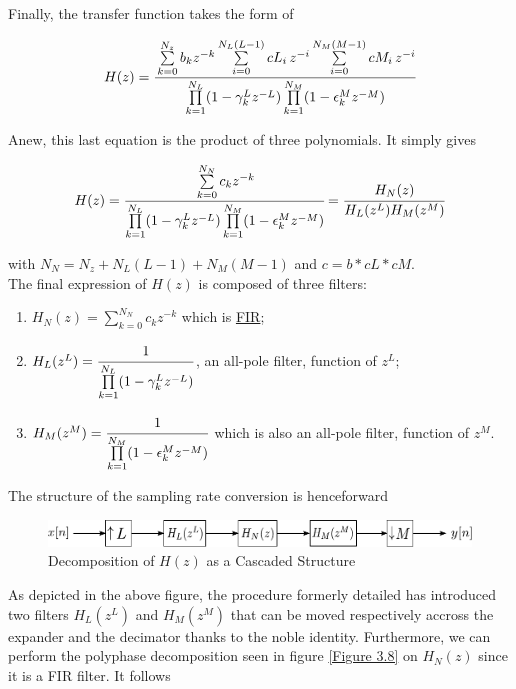 Finally, the transfer function takes the form of 

\begin{align}
	H(z) = \cfrac{\sum\limits_{k=0}^{N_z} b_kz^{-k}\sum\limits_{i=0}^{N_L(L-1)}cL_i\,z^{-i}\sum\limits_{i=0}^{N_M(M-1)}cM_i\,z^{-i}}{\prod\limits_{k=1}^{N_L} (1 - \gamma_k^L z^{-L}) \prod\limits_{k=1}^{N_M} (1 - \epsilon_k^M z^{-M})}
\end{align}

Anew, this last equation is the product of three polynomials. It simply gives 

\begin{align}
H(z) = \cfrac{\sum\limits_{k=0}^{N_N} c_kz^{-k}}{\prod\limits_{k=1}^{N_L} (1 - \gamma_k^L z^{-L}) \prod\limits_{k=1}^{N_M} (1 - \epsilon_k^M z^{-M})} = \cfrac{H_N(z)}{H_L(z^L)H_M(z^M)}\label{eqn:3.22}
\end{align}

with $N_N = N_z + N_L(L-1) + N_M(M-1)$ and $c = b*cL*cM$. \\


The final expression of $H(z)$ is composed of three filters: 

\begin{enumerate}
	\item $H_N(z) = \sum\limits_{k=0}^{N_N} c_kz^{-k}$ which is \hyperlink{FIR}{FIR};
	\item $H_L(z^L)  = \cfrac{1}{\prod\limits_{k=1}^{N_L} (1 - \gamma_k^L z^{-L})}$, an all-pole filter, function of $z^L$;
	\item $H_M(z^M) = \cfrac{1}{\prod\limits_{k=1}^{N_M} (1 - \epsilon_k^M z^{-M})}$ which is also an all-pole filter, function of $z^M$.
\end{enumerate}

\newpage
The structure of the sampling rate conversion is henceforward

\begin{figure}[ht!]
	\centering
	\hspace*{-5mm}
	\includegraphics[scale = 0.8]{russell.pdf}
	\caption{Decomposition of $H(z)$ as a Cascaded Structure}
	\label{Figure 3.10}
\end{figure}

As depicted in the above figure, the procedure formerly detailed has introduced two filters $H_L(z^L)$ and $H_M(z^M)$ that can be moved respectively accross the expander and the decimator thanks to the noble identity. Furthermore, we can perform the polyphase decomposition seen in figure \ref{Figure 3.8} on $H_N(z)$ since it is a FIR filter. It follows

